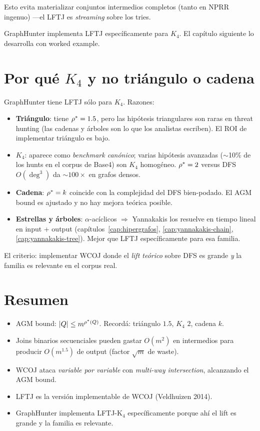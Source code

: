 \noindent
Esto evita materializar conjuntos intermedios completos
(tanto en NPRR ingenuo) ---el LFTJ es \emph{streaming} sobre los
tries.

GraphHunter implementa LFTJ específicamente para \(K_4\). El
capítulo siguiente lo desarrolla con worked example.

\section{Por qué \(K_4\) y no triángulo o cadena}

GraphHunter tiene LFTJ sólo para \(K_4\). Razones:

\begin{itemize}
    \item \textbf{Triángulo}: tiene \(\rho^{*} = 1.5\), pero las
    hipótesis triangulares son raras en threat hunting (las
    cadenas y árboles son lo que los analistas escriben). El ROI
    de implementar triángulo es bajo.
    \item \textbf{\(K_4\)}: aparece como \emph{benchmark
    canónico}; varias hipótesis avanzadas ($\sim$10\% de los hunts
    en el corpus de Base4) son \(K_4\) homogéneo. \(\rho^{*} = 2\)
    versus DFS \(O(\deg^3)\) da \(\sim 100\times\) en grafos
    densos.
    \item \textbf{Cadena}: \(\rho^{*} = k\) coincide con la
    complejidad del DFS bien-podado. El AGM bound es ajustado y
    no hay mejora teórica posible.
    \item \textbf{Estrellas y árboles}: \(\alpha\)-acíclicos $\Rightarrow$
    Yannakakis los resuelve en tiempo lineal en input + output
    (capítulos~\ref{cap:hipergrafos}, \ref{cap:yannakakis-chain},
    \ref{cap:yannakakis-tree}). Mejor que LFTJ específicamente
    para esa familia.
\end{itemize}

\noindent
El criterio: implementar WCOJ donde el \emph{lift teórico} sobre
DFS es grande \emph{y} la familia es relevante en el corpus real.

\section{Resumen}

\begin{itemize}
    \item AGM bound: \(|Q| \leq m^{\rho^{*}(Q)}\). Recordá:
    triángulo \(1.5\), \(K_4\) \(2\), cadena \(k\).
    \item Joins binarios secuenciales pueden gastar
    \(O(m^2)\) en intermedios para producir \(O(m^{1.5})\) de
    output (factor \(\sqrt{m}\) de waste).
    \item WCOJ ataca \emph{variable por variable} con
    \emph{multi-way intersection}, alcanzando el AGM bound.
    \item LFTJ es la versión implementable de WCOJ (Veldhuizen
    2014).
    \item GraphHunter implementa LFTJ-K\(_4\) específicamente
    porque ahí el lift es grande y la familia es relevante.
\end{itemize}

